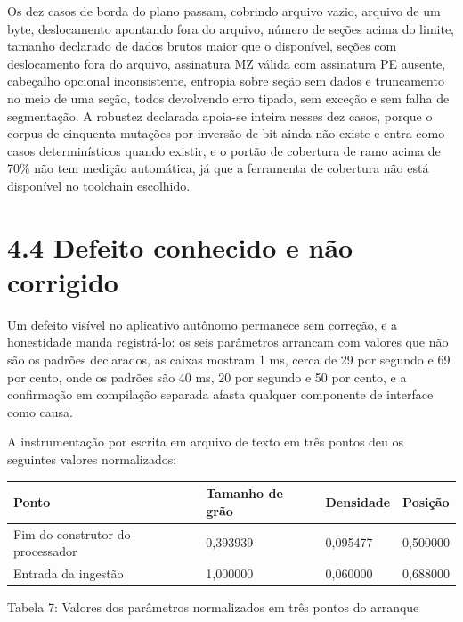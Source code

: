 \documentclass[11pt,a4paper]{article}
\begin{document}
Os dez casos de borda do plano passam, cobrindo arquivo vazio, arquivo de um byte, deslocamento apontando fora do arquivo, número de seções acima do limite, tamanho declarado de dados brutos maior que o disponível, seções com deslocamento fora do arquivo, assinatura MZ válida com assinatura PE ausente, cabeçalho opcional inconsistente, entropia sobre seção sem dados e truncamento no meio de uma seção, todos devolvendo erro tipado, sem exceção e sem falha de segmentação. A robustez declarada apoia-se inteira nesses dez casos, porque o corpus de cinquenta mutações por inversão de bit ainda não existe e entra como casos determinísticos quando existir, e o portão de cobertura de ramo acima de 70\% não tem medição automática, já que a ferramenta de cobertura não está disponível no toolchain escolhido.


\section*{4.4 Defeito conhecido e não corrigido}

Um defeito visível no aplicativo autônomo permanece sem correção, e a honestidade manda registrá-lo: os seis parâmetros arrancam com valores que não são os padrões declarados, as caixas mostram 1 ms, cerca de 29 por segundo e 69 por cento, onde os padrões são 40 ms, 20 por segundo e 50 por cento, e a confirmação em compilação separada afasta qualquer componente de interface como causa.


A instrumentação por escrita em arquivo de texto em três pontos deu os seguintes valores normalizados:


\begin{center}
\scriptsize
\setlength{\tabcolsep}{4pt}
\begin{tabular}{p{}|p{}|p{}|p{}}
\hline
\textbf{Ponto} & \textbf{Tamanho de grão} & \textbf{Densidade} & \textbf{Posição} \\
\hline
Fim do construtor do processador & 0,393939 & 0,095477 & 0,500000 \\
Entrada da ingestão & 1,000000 & 0,060000 & 0,688000 \\
\hline
\end{tabular}
\end{center}
\noindent Tabela 7: Valores dos parâmetros normalizados em três pontos do arranque\par
\label{tab:7}
\vspace{2pt}{\footnotesize\noindent Autores\par}
\end{document}
